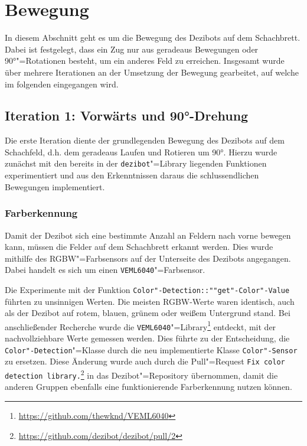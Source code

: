 
\section{Bewegung}
\label{sec:movement}

In diesem Abschnitt geht es um die Bewegung des Dezibots auf dem Schachbrett. Dabei ist festgelegt, dass ein Zug nur aus geradeaus Bewegungen oder 90°"=Rotationen besteht, um ein anderes Feld zu erreichen. Insgesamt wurde über mehrere Iterationen an der Umsetzung der Bewegung gearbeitet, auf welche im folgenden eingegangen wird.


\subsection{Iteration 1: Vorwärts und 90°-Drehung}
\label{sec:move-straight-turn}

Die erste Iteration diente der grundlegenden Bewegung des Dezibots auf dem Schachfeld, d.h. dem geradeaus Laufen und Rotieren um 90°. Hierzu wurde zunächst mit den bereits in der \texttt{dezibot}"=Library liegenden Funktionen experimentiert und aus den Erkenntnissen daraus die schlussendlichen Bewegungen implementiert. 

\subsubsection{Farberkennung}
\label{sec:colour-detection}

Damit der Dezibot sich eine bestimmte Anzahl an Feldern nach vorne bewegen kann, müssen die Felder auf dem Schachbrett erkannt werden. Dies wurde mithilfe des RGBW"=Farbsensors auf der Unterseite des Dezibots angegangen. Dabei handelt es sich um einen \texttt{VEML6040}"=Farbsensor.

Die Experimente mit der Funktion \texttt{Color"-Detection::""get"-Color"-Value} führten zu unsinnigen Werten. Die meisten RGBW-Werte waren identisch, auch als der Dezibot auf rotem, blauen, grünem oder weißem Untergrund stand. Bei anschließender Recherche wurde die \texttt{VEML6040}"=Library\footnote{\url{https://github.com/thewknd/VEML6040}} entdeckt, mit der nachvollziehbare Werte gemessen werden. Dies führte zu der Entscheidung, die \texttt{Color"-Detection}"=Klasse durch die neu implementierte Klasse \texttt{Color"-Sensor} zu ersetzen. Diese Änderung wurde auch durch die Pull"=Request \texttt{Fix color detection library.}\footnote{\url{https://github.com/dezibot/dezibot/pull/2}} in das Dezibot"=Repository übernommen, damit die anderen Gruppen ebenfalls eine funktionierende Farberkennung nutzen können.

